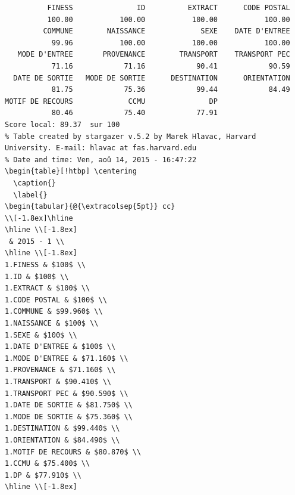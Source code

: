 \documentclass[]{article}
\begin{document}
\begin{verbatim}
          FINESS               ID          EXTRACT      CODE POSTAL 
          100.00           100.00           100.00           100.00 
         COMMUNE        NAISSANCE             SEXE    DATE D'ENTREE 
           99.96           100.00           100.00           100.00 
   MODE D'ENTREE       PROVENANCE        TRANSPORT    TRANSPORT PEC 
           71.16            71.16            90.41            90.59 
  DATE DE SORTIE   MODE DE SORTIE      DESTINATION      ORIENTATION 
           81.75            75.36            99.44            84.49 
MOTIF DE RECOURS             CCMU               DP 
           80.46            75.40            77.91 
Score local: 89.37  sur 100
% Table created by stargazer v.5.2 by Marek Hlavac, Harvard University. E-mail: hlavac at fas.harvard.edu
% Date and time: Ven, aoû 14, 2015 - 16:47:22
\begin{table}[!htbp] \centering 
  \caption{} 
  \label{} 
\begin{tabular}{@{\extracolsep{5pt}} cc} 
\\[-1.8ex]\hline 
\hline \\[-1.8ex] 
 & 2015 - 1 \\ 
\hline \\[-1.8ex] 
1.FINESS & $100$ \\ 
1.ID & $100$ \\ 
1.EXTRACT & $100$ \\ 
1.CODE POSTAL & $100$ \\ 
1.COMMUNE & $99.960$ \\ 
1.NAISSANCE & $100$ \\ 
1.SEXE & $100$ \\ 
1.DATE D'ENTREE & $100$ \\ 
1.MODE D'ENTREE & $71.160$ \\ 
1.PROVENANCE & $71.160$ \\ 
1.TRANSPORT & $90.410$ \\ 
1.TRANSPORT PEC & $90.590$ \\ 
1.DATE DE SORTIE & $81.750$ \\ 
1.MODE DE SORTIE & $75.360$ \\ 
1.DESTINATION & $99.440$ \\ 
1.ORIENTATION & $84.490$ \\ 
1.MOTIF DE RECOURS & $80.870$ \\ 
1.CCMU & $75.400$ \\ 
1.DP & $77.910$ \\ 
\hline \\[-1.8ex] 

\end{verbatim}
\end{document}
